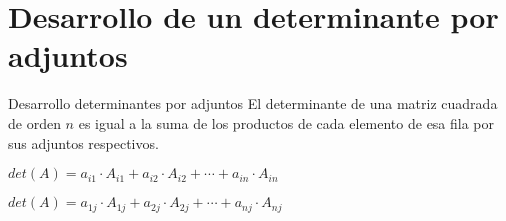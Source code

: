 \section{Desarrollo de un determinante por adjuntos}

\begin{definicion}{Desarrollo determinantes por adjuntos}
El determinante de una matriz cuadrada de orden $n$ es igual a la suma de los productos de cada elemento de esa fila por sus adjuntos respectivos.

$det(A)= a_{i1}\cdot A_{i1}+a_{i2}\cdot A_{i2}+\cdots +a_{in}\cdot A_{in}$

$det(A)= a_{1j}\cdot A_{1j}+a_{2j}\cdot A_{2j}+\cdots +a_{nj}\cdot A_{nj}$
\end{definicion}



